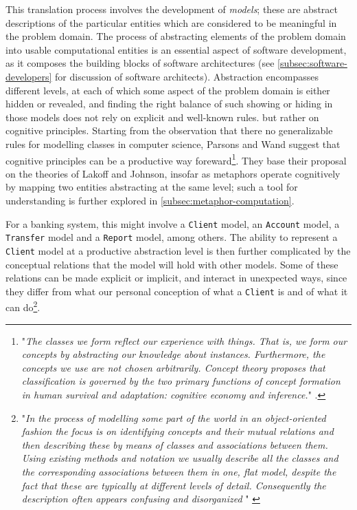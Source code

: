 This translation process involves the development of \emph{models}; these are abstract descriptions of the particular entities which are considered to be meaningful in the problem domain. The process of abstracting elements of the problem domain into usable computational entities is an essential aspect of software development, as it composes the building blocks of software architectures (see \ref{subsec:software-developers} for discussion of software architects). Abstraction encompasses different levels, at each of which some aspect of the problem domain is either hidden or revealed, and finding the right balance of such showing or hiding in those models does not rely on explicit and well-known rules. but rather on cognitive principles. Starting from the observation that there no generalizable rules for modelling classes in computer science, Parsons and Wand suggest that cognitive principles can be a productive way foreward\footnote{"\emph{The classes we form reflect our experience with things. That is, we form our concepts by abstracting our knowledge about instances. Furthermore, the concepts we use are not chosen arbitrarily. Concept theory proposes that classification is governed by the two primary functions of concept formation in human survival and adaptation: cognitive economy and inference.}" \citep{parsons_choosing_1997}.}. They base their proposal on the theories of Lakoff and Johnson, insofar as metaphors operate cognitively by mapping two entities abstracting at the same level; such a tool for understanding is further explored in \ref{subsec:metaphor-computation}.

For a banking system, this might involve a \lstinline{Client} model, an \lstinline{Account} model, a \lstinline{Transfer} model and a \lstinline{Report} model, among others. The ability to represent a \lstinline{Client} model at a productive abstraction level is then further complicated by the conceptual relations that the model will hold with other models. Some of these relations can be made explicit or implicit, and interact in unexpected ways, since they differ from what our personal conception of what a \lstinline{Client} is and of what it can do\footnote{"\emph{In the process of modelling some part of the world in an object-oriented fashion the focus is on identifying concepts and their mutual relations and then describing these by means of classes and associations between them. Using existing methods and notation we usually describe all the classes and the corresponding associations between them in one, flat model, despite the fact that these are typically at different levels of detail. Consequently the description often appears confusing and disorganized} " \citep{kristensen_complex_1994}}.

